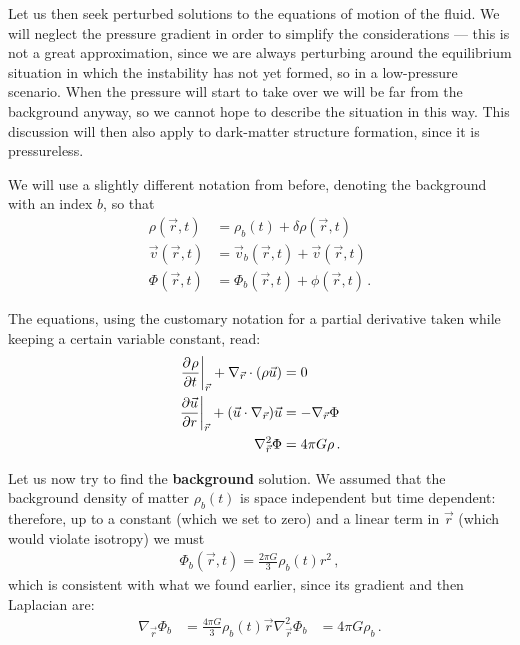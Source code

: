 \documentclass[main.tex]{subfiles}
\begin{document}
Let us then seek perturbed solutions to the equations of motion of the fluid.
We will neglect the pressure gradient in order to simplify the considerations --- this is not a great approximation, since we are always perturbing around the equilibrium situation in which the instability has not yet formed, so in a low-pressure scenario. When the pressure will start to take over we will be far from the background anyway, so we cannot hope to describe the situation in this way. 
This discussion will then also apply to dark-matter structure formation, since it is pressureless.

We will use a slightly different notation from before, denoting the background with an index \(b\), so that 
%
\begin{align}
\rho (\vec{r}, t) &= \rho _b (t) + \delta \rho (\vec{r}, t)  \\
\vec{v} (\vec{r}, t) &= \vec{v}_b (\vec{r}, t) + \vec{v} (\vec{r}, t)  \\
\Phi (\vec{r}, t) &= \Phi _b (\vec{r}, t) + \phi (\vec{r}, t)
\,.
\end{align}

The equations, using the customary notation for a partial derivative taken while keeping a certain variable constant, read:
%
\begin{align}
  \eval{\pdv[]{\rho }{t}}_{\vec{r}} + \nabla_{\vec{r}} \cdot \qty(\rho \vec{u}) &= 0 \\ 
  \eval{\pdv{\vec{u}}{r}}_{\vec{r}} + \qty(\vec{u} \cdot \nabla_{\vec{r}}) \vec{u} &= - \nabla_{\vec{r}} \Phi \\
  \nabla^2_{\vec{r}} \Phi  &= 4 \pi G \rho 
\,.
\end{align}


Let us now try to find the \textbf{background} solution. We assumed that the background density of matter \(\rho _b(t)\) is space independent but time dependent: therefore, up to a constant (which we set to zero) and a linear term in \(\vec{r}\) (which would violate isotropy) we must
%
\begin{align}
  \Phi_{b } (\vec{r}, t) = \frac{2 \pi G}{3} \rho_{b} (t) r^2
\,,
\end{align}
%
which is consistent with what we found earlier, since its gradient and then Laplacian are:
%
\begin{align}
  \nabla_{\vec{r}} \Phi_{b} &= \frac{4 \pi G}{3} \rho_b (t) \vec{r} 
  \nabla^2_{\vec{r}} \Phi_{b} &= 4 \pi G \rho_b
\,.
\end{align}
\end{document}
